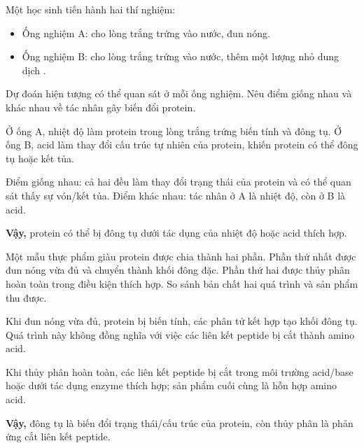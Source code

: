 \begin{tuluyen}
Một học sinh tiến hành hai thí nghiệm:
\begin{itemize}
\item Ống nghiệm A: cho lòng trắng trứng vào nước, đun nóng.
\item Ống nghiệm B: cho lòng trắng trứng vào nước, thêm một lượng nhỏ dung dịch .
\end{itemize}
Dự đoán hiện tượng có thể quan sát ở mỗi ống nghiệm. Nêu điểm giống nhau và khác nhau về tác nhân gây biến đổi protein.
\begin{loigiaiBT}
Ở ống A, nhiệt độ làm protein trong lòng trắng trứng biến tính và đông tụ. Ở ống B, acid làm thay đổi cấu trúc tự nhiên của protein, khiến protein có thể đông tụ hoặc kết tủa.

Điểm giống nhau: cả hai đều làm thay đổi trạng thái của protein và có thể quan sát thấy sự vón/kết tủa. Điểm khác nhau: tác nhân ở A là nhiệt độ, còn ở B là acid.

\textbf{Vậy,} protein có thể bị đông tụ dưới tác dụng của nhiệt độ hoặc acid thích hợp.
\end{loigiaiBT}
\end{tuluyen}

\begin{tuluyen}
Một mẫu thực phẩm giàu protein được chia thành hai phần. Phần thứ nhất được đun nóng vừa đủ và chuyển thành khối đông đặc. Phần thứ hai được thủy phân hoàn toàn trong điều kiện thích hợp. So sánh bản chất hai quá trình và sản phẩm thu được.
\begin{loigiaiBT}
Khi đun nóng vừa đủ, protein bị biến tính, các phân tử kết hợp tạo khối đông tụ. Quá trình này không đồng nghĩa với việc các liên kết peptide bị cắt thành amino acid.

Khi thủy phân hoàn toàn, các liên kết peptide bị cắt trong môi trường acid/base hoặc dưới tác dụng enzyme thích hợp; sản phẩm cuối cùng là hỗn hợp amino acid.

\textbf{Vậy,} đông tụ là biến đổi trạng thái/cấu trúc của protein, còn thủy phân là phản ứng cắt liên kết peptide.
\end{loigiaiBT}
\end{tuluyen}

